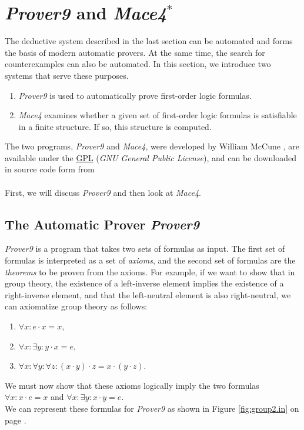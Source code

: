 \section{\textsl{Prover9} and \textsl{Mace4}$^*$}
The deductive system described in the last section can be automated and forms the basis of modern automatic
provers. At the same time, the search for counterexamples can also be automated. In this section, we introduce
two systems that serve these purposes. 
\begin{enumerate}
\item \textsl{Prover9} is used to automatically prove first-order logic formulas.
\item \textsl{Mace4} examines whether a given set of first-order logic formulas is satisfiable in a finite
      structure. If so, this structure is computed. 
\end{enumerate}
The two programs, \textsl{Prover9} and \textsl{Mace4}, were developed by William McCune \cite{mccune:2010}, are
available under the \href{http://www.gnu.org/licenses/gpl.html}{GPL} (\emph{GNU General Public License}), and
can be downloaded in source code form from 
\\[0.2cm]
\hspace*{1.3cm}
\href{http://www.cs.unm.edu/~mccune/prover9/download/}{}
\\[0.2cm]
First, we will discuss \textsl{Prover9} and then look at \textsl{Mace4}.

\subsection{The Automatic Prover \textsl{Prover9}}
\textsl{Prover9} is a program that takes two sets of formulas as input. The first set of formulas is interpreted as a set of \emph{axioms}, and the second set of formulas are the \emph{theorems} to be proven from the axioms. For example, if we want to show that in group theory, the existence of a left-inverse element implies the existence of a right-inverse element, and that the left-neutral element is also right-neutral, we can axiomatize group theory as follows:
\begin{enumerate}
\item $\forall x: e \cdot x = x$,
\item $\forall x: \exists y: y \cdot x = e$,
\item $\forall x: \forall y: \forall z: (x \cdot y) \cdot z = x \cdot (y \cdot z)$.
\end{enumerate}
We must now show that these axioms logically imply the two formulas
\\[0.2cm]
\hspace*{1.3cm}
$\forall x: x \cdot e = x$ \quad and \quad $\forall x: \exists y: x \cdot y = e$.
\\[0.2cm]
We can represent these formulas for \textsl{Prover9} as shown in Figure \ref{fig:group2.in} on page
\pageref{fig:group2.in}. 

